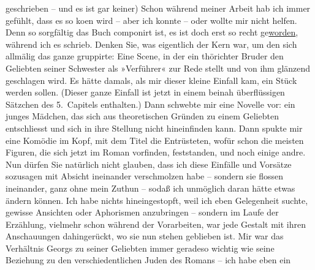 \begin{ledgroupsized}[t]{13cm}
               geschrieben – und es ist gar keiner) Schon während meiner Arbeit hab ich immer
               gefühlt, dass es so ko{\geminationm}en wird – aber ich konnte – oder
               wollte mir nicht helfen. Denn so sorgfältig das Buch componirt ist, es ist doch erst
               so recht ge{\pb}\uline{worden}, während ich es schrieb. Denken Sie, was
               eigentlich der Kern war, um den sich allmälig das ganze gruppirte: Eine Scene, in der
               ein thörichter Bruder den Geliebten seiner Schwester als »Verführer« zur Rede stellt
               und von ihm glänzend geschlagen wird. Es hätte damals, als mir dieser kleine Einfall
               kam, ein Stück werden sollen. (Dieser ganze Einfall ist jetzt in einem beinah
               überflüssigen Sätzchen des 5. Capitels enthalten.) Dann schwebte mir eine Novelle
               vor: ein junges Mädchen, das sich aus theoretischen Gründen zu einem Geliebten
               entschliesst und sich in ihre Stellung nicht hineinfinden kann. Dann spukte mir eine
               Komödie im Kopf, mit dem Titel {\pb}die Entrüsteten, wofür schon die
               meisten Figuren, die sich jetzt im Roman vorfinden, feststanden, und noch einige
               andre. Nun dürfen Sie natürlich nicht glauben, dass ich diese Einfälle und Vorsätze
               sozusagen mit Absicht ineinander verschmolzen habe – sondern sie flossen ineinander,
               ganz ohne mein Zuthun – sodaß ich unmöglich daran hätte etwas ändern können. Ich habe
               nichts hineingestopft, weil ich eben Gelegenheit suchte, gewisse Ansichten oder
               Aphorismen anzubringen – sondern im Laufe der Erzählung, vielmehr schon während der
               Vorarbeiten, war jede Gestalt mit ihren Anschauungen dahingerückt, wo sie nun stehen
               geblieben ist. Mir war {\pb}das Verhältnis Georgs zu seiner Geliebten
               immer geradeso wichtig wie seine Beziehung zu den verschiedentlichen Juden des Romans – ich habe eben ein

\end{ledgroupsized}
